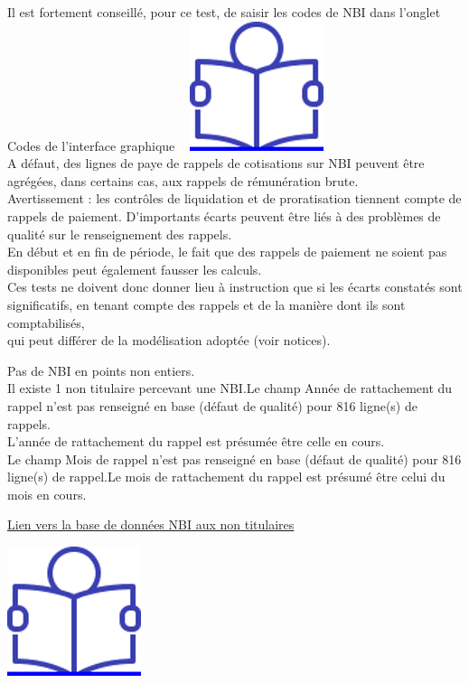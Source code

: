 Il est fortement conseillé, pour ce test, de saisir les codes de NBI
dans l'onglet Codes de l'interface graphique ~
\href{../Docs/Notices/fiche_onglet_codes.odt}{\includegraphics{icones/Notice.png}}\\
A défaut, des lignes de paye de rappels de cotisations sur NBI peuvent
être agrégées, dans certains cas, aux rappels de rémunération brute.\\
Avertissement : les contrôles de liquidation et de proratisation
tiennent compte de rappels de paiement. D'importants écarts peuvent être
liés à des problèmes de qualité sur le renseignement des rappels.\\
En début et en fin de période, le fait que des rappels de paiement ne
soient pas disponibles peut également fausser les calculs.\\
Ces tests ne doivent donc donner lieu à instruction que si les écarts
constatés sont significatifs, en tenant compte des rappels et de la
manière dont ils sont comptabilisés,\\
qui peut différer de la modélisation adoptée (voir notices).

Pas de NBI en points non entiers.\\
Il existe 1 non titulaire percevant une NBI.Le champ Année de
rattachement du rappel n'est pas renseigné en base (défaut de qualité)
pour 816 ligne(s) de rappels.\\
L'année de rattachement du rappel est présumée être celle en cours.\\
Le champ Mois de rappel n'est pas renseigné en base (défaut de qualité)
pour 816 ligne(s) de rappel.Le mois de rattachement du rappel est
présumé être celui du mois en cours.

\href{../Bases/Reglementation/NBI.aux.non.titulaires.csv}{Lien vers la base
de données NBI aux non titulaires}

\href{../Docs/Notices/fiche_NBI_nt.odt}{\includegraphics{icones/Notice.png}}

